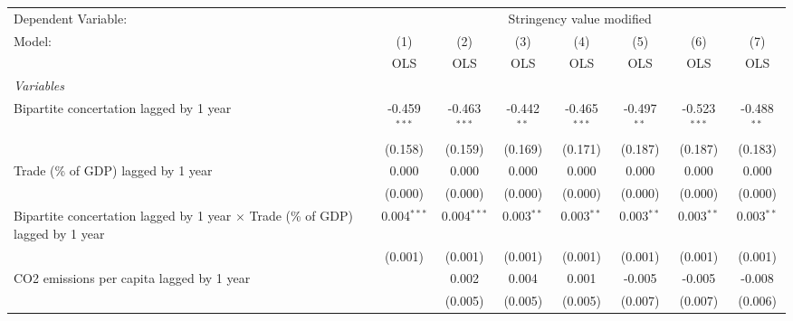 
\begingroup
\centering
\begin{tabular}{lccccccc}
   \toprule
   Dependent Variable: & \multicolumn{7}{c}{Stringency value modified}\\
   Model:                                                                                & (1)            & (2)            & (3)           & (4)            & (5)           & (6)            & (7)\\  
                                                                                         &  OLS           & OLS            & OLS           & OLS            & OLS           & OLS            & OLS\\  
   \midrule
   \emph{Variables}\\
   Bipartite concertation lagged by 1 year                                               & -0.459$^{***}$ & -0.463$^{***}$ & -0.442$^{**}$ & -0.465$^{***}$ & -0.497$^{**}$ & -0.523$^{***}$ & -0.488$^{**}$\\   
                                                                                         & (0.158)        & (0.159)        & (0.169)       & (0.171)        & (0.187)       & (0.187)        & (0.183)\\   
   Trade (\% of GDP) lagged by 1 year                                                    & 0.000          & 0.000          & 0.000         & 0.000          & 0.000         & 0.000          & 0.000\\   
                                                                                         & (0.000)        & (0.000)        & (0.000)       & (0.000)        & (0.000)       & (0.000)        & (0.000)\\   
   Bipartite concertation lagged by 1 year $\times$ Trade (\% of GDP) lagged by 1 year   & 0.004$^{***}$  & 0.004$^{***}$  & 0.003$^{**}$  & 0.003$^{**}$   & 0.003$^{**}$  & 0.003$^{**}$   & 0.003$^{**}$\\   
                                                                                         & (0.001)        & (0.001)        & (0.001)       & (0.001)        & (0.001)       & (0.001)        & (0.001)\\   
   CO2 emissions per capita lagged by 1 year                                             &                & 0.002          & 0.004         & 0.001          & -0.005        & -0.005         & -0.008\\   
                                                                                         &                & (0.005)        & (0.005)       & (0.005)        & (0.007)       & (0.007)        & (0.006)\\   

\end{tabular}
